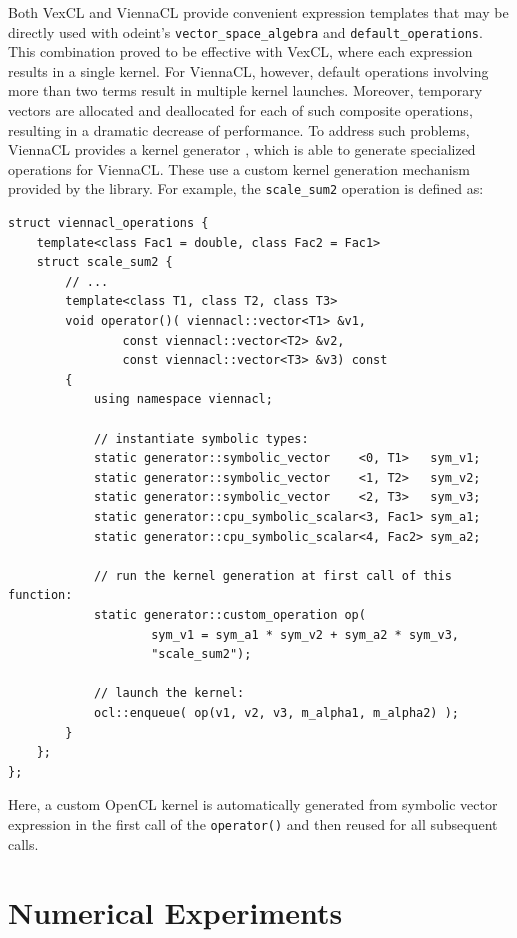 \documentclass[final]{siamltex}
\newcommand{\code}[1]{\lstinline|#1|}
\begin{document}
Both VexCL and ViennaCL provide convenient expression templates that may be
directly used with odeint's \code{vector_space_algebra} and
\code{default_operations}. This combination proved to be effective with VexCL,
where each expression results in a single kernel. For ViennaCL, however,
default operations involving more than two terms result in multiple kernel
launches.  Moreover, temporary vectors are allocated and deallocated for each
of such composite operations, resulting in a dramatic decrease of performance.
To address such problems, ViennaCL provides a kernel generator
\cite{tillet:kernel-generator}, which is able to generate specialized
operations for ViennaCL. These use a custom kernel generation mechanism
provided by the library.  For example, the \code{scale_sum2} operation is
defined as:
\begin{lstlisting}
struct viennacl_operations {
    template<class Fac1 = double, class Fac2 = Fac1>
    struct scale_sum2 {
        // ...
        template<class T1, class T2, class T3>
        void operator()( viennacl::vector<T1> &v1,
                const viennacl::vector<T2> &v2,
                const viennacl::vector<T3> &v3) const
        {
            using namespace viennacl;

            // instantiate symbolic types:
            static generator::symbolic_vector    <0, T1>   sym_v1;
            static generator::symbolic_vector    <1, T2>   sym_v2;
            static generator::symbolic_vector    <2, T3>   sym_v3;
            static generator::cpu_symbolic_scalar<3, Fac1> sym_a1;
            static generator::cpu_symbolic_scalar<4, Fac2> sym_a2;

            // run the kernel generation at first call of this function:
            static generator::custom_operation op(
                    sym_v1 = sym_a1 * sym_v2 + sym_a2 * sym_v3,
                    "scale_sum2");

            // launch the kernel:
            ocl::enqueue( op(v1, v2, v3, m_alpha1, m_alpha2) );
        }
    };
};
\end{lstlisting}
Here, a custom OpenCL kernel is automatically generated from symbolic vector
expression in the first call of the \code{operator()} and then reused for all
subsequent calls.









%
%
\section{Numerical Experiments}
\end{document}
